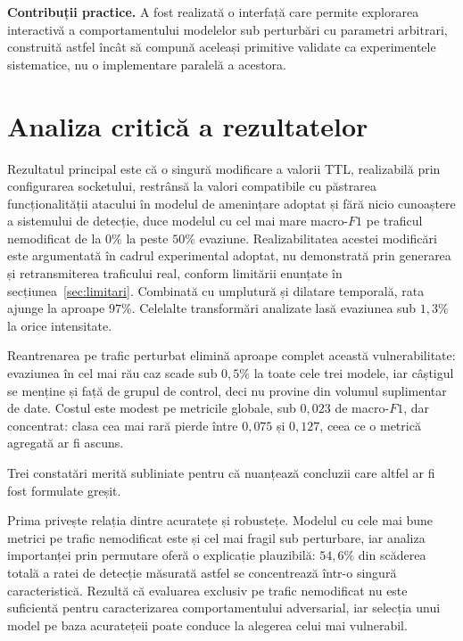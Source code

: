 \textbf{Contribuții practice.} A fost realizată o interfață care permite explorarea interactivă a comportamentului modelelor sub perturbări cu parametri arbitrari, construită astfel încât să compună aceleași primitive validate ca experimentele sistematice, nu o implementare paralelă a acestora.

\section{Analiza critică a rezultatelor}\label{sec:critica}

Rezultatul principal este că o singură modificare a valorii TTL, realizabilă prin configurarea socketului, restrânsă la valori compatibile cu păstrarea funcționalității atacului în modelul de amenințare adoptat și fără nicio cunoaștere a sistemului de detecție, duce modelul cu cel mai mare macro-$F1$ pe traficul nemodificat de la $0\%$ la peste $50\%$ evaziune. Realizabilitatea acestei modificări este argumentată în cadrul experimental adoptat, nu demonstrată prin generarea și retransmiterea traficului real, conform limitării enunțate în secțiunea~\ref{sec:limitari}. Combinată cu umplutură și dilatare temporală, rata ajunge la aproape $97\%$. Celelalte transformări analizate lasă evaziunea sub $1{,}3\%$ la orice intensitate.

Reantrenarea pe trafic perturbat elimină aproape complet această vulnerabilitate: evaziunea în cel mai rău caz scade sub $0{,}5\%$ la toate cele trei modele, iar câștigul se menține și față de grupul de control, deci nu provine din volumul suplimentar de date. Costul este modest pe metricile globale, sub $0{,}023$ de macro-$F1$, dar concentrat: clasa cea mai rară pierde între $0{,}075$ și $0{,}127$, ceea ce o metrică agregată ar fi ascuns.

Trei constatări merită subliniate pentru că nuanțează concluzii care altfel ar fi fost formulate greșit.

Prima privește relația dintre acuratețe și robustețe. Modelul cu cele mai bune metrici pe trafic nemodificat este și cel mai fragil sub perturbare, iar analiza importanței prin permutare oferă o explicație plauzibilă: $54{,}6\%$ din scăderea totală a ratei de detecție măsurată astfel se concentrează într-o singură caracteristică. Rezultă că evaluarea exclusiv pe trafic nemodificat nu este suficientă pentru caracterizarea comportamentului adversarial, iar selecția unui model pe baza acuratețeii poate conduce la alegerea celui mai vulnerabil.

